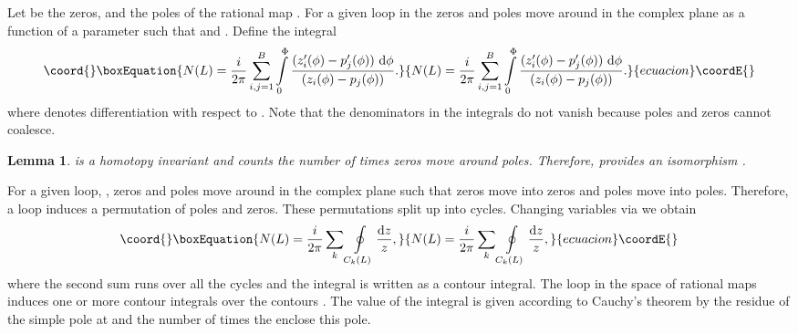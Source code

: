 \documentclass[a4paper,12pt]{article}
\newtheorem {lemma}[theorem]{Lemma}
\begin{document}
Let \coordHE{} be the zeros, and \coordHE{} the poles of 
the rational map \coordHE{}. For a given loop \coordHE{} in \coordHE{} the zeros and 
poles move around in the complex plane as a function of a parameter \myHighlight{$\phi \in 
[0,\Phi]$}\coordHE{} such that \coordHE{} and \coordHE{}. 
Define the integral  
%
\begin{equation}\coord{}\boxEquation{
\label{def:N}
N(L) = \frac{i}{2 \pi} \sum\limits_{i,j=1}^{B}
\int\limits_0^{\Phi}
\frac{(z_i^\prime(\phi) - p_j^\prime(\phi)) ~{\rm d} \phi}
{(z_i(\phi) - p_j(\phi))}.
}{
N(L) = \frac{i}{2 \pi} \sum\limits_{i,j=1}^{B}
\int\limits_0^{\Phi}
\frac{(z_i^\prime(\phi) - p_j^\prime(\phi)) ~{\rm d} \phi}
{(z_i(\phi) - p_j(\phi))}.
}{ecuacion}\coordE{}\end{equation}
%
where \myHighlight{${}^\prime$}\coordHE{} denotes differentiation with respect to \myHighlight{$\phi$}\coordHE{}.
Note that the denominators in the integrals do not vanish because poles 
and zeros cannot coalesce. 
%
\begin{lemma}
\label{l:iso}
\coordHE{} is a homotopy invariant and counts the number of times zeros 
move around poles. Therefore, \coordHE{} provides an isomorphism \coordHE{}.
\end{lemma}

%
For a given loop, \coordHE{}, zeros and poles move around in the complex plane 
such that zeros move into zeros and poles move into poles. Therefore, a 
loop induces a permutation of poles and zeros. These permutations 
split up into cycles. Changing variables via \coordHE{} we obtain
%
\begin{equation}\coord{}\boxEquation{
N(L) = \frac{i}{2 \pi} \sum\limits_{k}
\oint\limits_{C_k(L)} \frac{{\rm d}z}{z},
}{
N(L) = \frac{i}{2 \pi} \sum\limits_{k}
\oint\limits_{C_k(L)} \frac{{\rm d}z}{z},
}{ecuacion}\coordE{}\end{equation}
%
where the second sum runs over all the cycles and 
the integral is written as a contour integral.
The loop \coordHE{} in the space
of rational maps induces one or more contour integrals over the contours 
\coordHE{}.
The value of the integral is given according to Cauchy's theorem by 
the residue of the simple pole at \coordHE{} and the number of times the 
\coordHE{} enclose this pole.
\end{document}
